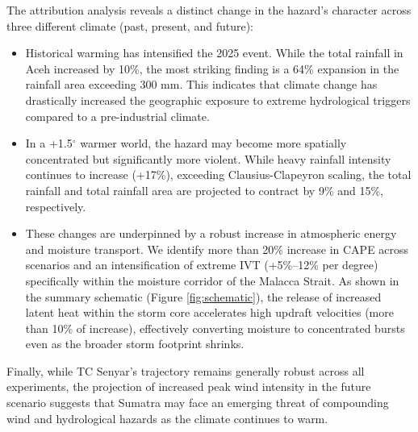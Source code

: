 The attribution analysis reveals a distinct change in the hazard's character across three different climate (past, present, and future):
\begin{itemize}
    \item Historical warming has intensified the 2025 event. While the total rainfall in Aceh increased by 10\%, the most striking finding is a 64\% expansion in the rainfall area exceeding 300 mm. This indicates that climate change has drastically increased the geographic exposure to extreme hydrological triggers compared to a pre-industrial climate.
    \item In a +1.5$^\circ$ warmer world, the hazard may become more spatially concentrated but significantly more violent. While heavy rainfall intensity continues to increase (+17\%), exceeding Clausius-Clapeyron scaling, the total rainfall and total rainfall area are projected to contract by 9\% and 15\%, respectively.
    \item These changes are underpinned by a robust increase in atmospheric energy and moisture transport. We identify more than 20\% increase in CAPE across scenarios and an intensification of extreme IVT (+5\%–12\% per degree) specifically within the moisture corridor of the Malacca Strait. As shown in the summary schematic (Figure \ref{fig:schematic}), the release of increased latent heat within the storm core accelerates high updraft velocities (more than 10\% of increase), effectively converting moisture to concentrated bursts even as the broader storm footprint shrinks.
\end{itemize}

Finally, while TC Senyar’s trajectory remains generally robust across all experiments, the projection of increased peak wind intensity in the future scenario suggests that Sumatra may face an emerging threat of compounding wind and hydrological hazards as the climate continues to warm.

